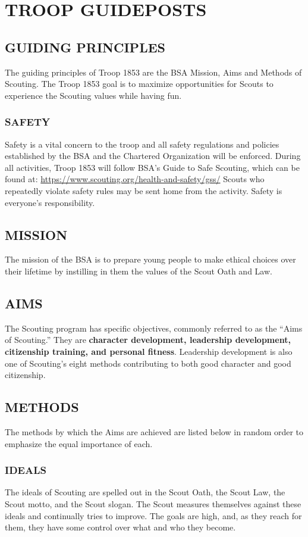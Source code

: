 \documentclass{ltxguide}
\begin{document}
\section{TROOP GUIDEPOSTS}
\subsection{GUIDING PRINCIPLES}
The guiding principles of Troop 1853 are the \ac{BSA} Mission, Aims and Methods of Scouting. The Troop 1853 goal is to maximize opportunities for Scouts to experience the Scouting values while having fun.

\subsubsection{SAFETY}
Safety is a vital concern to the troop and all safety regulations and policies established by the \ac{BSA} and the Chartered Organization will be enforced. During all activities, Troop 1853 will follow \ac{BSA}'s Guide to Safe Scouting, which can be found at:  \url{https://www.scouting.org/health-and-safety/gss/}  Scouts who repeatedly violate safety rules may be sent home from the activity. Safety is everyone's responsibility.

\subsection{MISSION}
The mission of the \ac{BSA} is to prepare young people to make ethical choices over their lifetime by instilling in them the values of the Scout Oath and Law.

\subsection{AIMS}
The Scouting program has specific objectives, commonly referred to as the “Aims of Scouting.” They are \textbf{character development, leadership development, citizenship training, and personal fitness}. Leadership development is also one of Scouting's eight methods contributing to both good character and good citizenship.

\subsection{METHODS}
The methods by which the Aims are achieved are listed below in random order to emphasize the equal importance of each.

\subsubsection{IDEALS}
The ideals of Scouting are spelled out in the Scout Oath, the Scout Law, the Scout motto, and the Scout slogan. The Scout measures themselves against these ideals and continually tries to improve. The goals are high, and, as they reach for them, they have some control over what and who they become.
\end{document}
